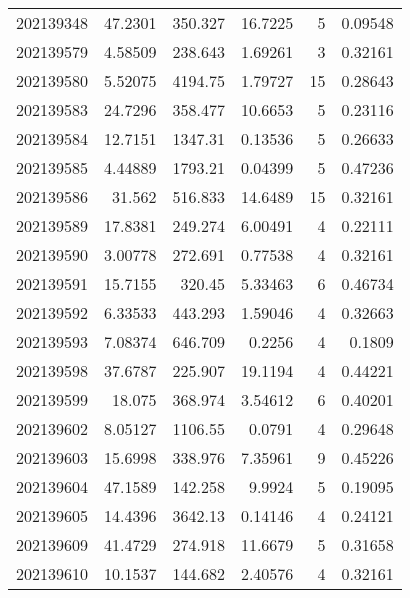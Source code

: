 \begin{tabular}{rrrrrr}
 202139348 &         47.2301  &      350.327  &           16.7225  &           5 & 0.09548 \\
 202139579 &          4.58509 &      238.643  &            1.69261 &           3 & 0.32161 \\
 202139580 &          5.52075 &     4194.75   &            1.79727 &          15 & 0.28643 \\
 202139583 &         24.7296  &      358.477  &           10.6653  &           5 & 0.23116 \\
 202139584 &         12.7151  &     1347.31   &            0.13536 &           5 & 0.26633 \\
 202139585 &          4.44889 &     1793.21   &            0.04399 &           5 & 0.47236 \\
 202139586 &         31.562   &      516.833  &           14.6489  &          15 & 0.32161 \\
 202139589 &         17.8381  &      249.274  &            6.00491 &           4 & 0.22111 \\
 202139590 &          3.00778 &      272.691  &            0.77538 &           4 & 0.32161 \\
 202139591 &         15.7155  &      320.45   &            5.33463 &           6 & 0.46734 \\
 202139592 &          6.33533 &      443.293  &            1.59046 &           4 & 0.32663 \\
 202139593 &          7.08374 &      646.709  &            0.2256  &           4 & 0.1809  \\
 202139598 &         37.6787  &      225.907  &           19.1194  &           4 & 0.44221 \\
 202139599 &         18.075   &      368.974  &            3.54612 &           6 & 0.40201 \\
 202139602 &          8.05127 &     1106.55   &            0.0791  &           4 & 0.29648 \\
 202139603 &         15.6998  &      338.976  &            7.35961 &           9 & 0.45226 \\
 202139604 &         47.1589  &      142.258  &            9.9924  &           5 & 0.19095 \\
 202139605 &         14.4396  &     3642.13   &            0.14146 &           4 & 0.24121 \\
 202139609 &         41.4729  &      274.918  &           11.6679  &           5 & 0.31658 \\
 202139610 &         10.1537  &      144.682  &            2.40576 &           4 & 0.32161 \\

\end{tabular}
